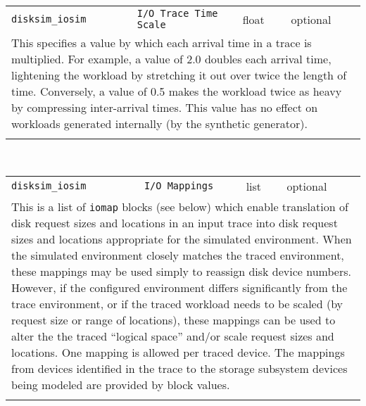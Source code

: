 \noindent 
\begin{tabular}{|p{1.5in}|p{3.5in}|p{0.5in}|p{0.5in}|}
\cline{1-4}
\texttt{disksim\_iosim} & \texttt{I/O Trace Time Scale} & float & optional \\ 
\cline{1-4}
\multicolumn{4}{|p{6in}|}{
This specifies a value by which each arrival time in a trace is
multiplied. For example, a value of 2.0 doubles each arrival time,
lightening the workload by stretching it out over twice the length of
time. Conversely, a value of 0.5 makes the workload twice as heavy by
compressing inter-arrival times. This value has no effect on
workloads generated internally (by the synthetic generator).
}\\ 
\cline{1-4}
\multicolumn{4}{p{5in}}{}\\
\end{tabular}\\ 
\noindent 
\begin{tabular}{|p{1.5in}|p{3.5in}|p{0.5in}|p{0.5in}|}
\cline{1-4}
\texttt{disksim\_iosim} & \texttt{I/O Mappings} & list & optional \\ 
\cline{1-4}
\multicolumn{4}{|p{6in}|}{
This is a list of \texttt{iomap} blocks (see below) which enable translation
of disk request sizes and locations in an input trace into disk
request sizes and locations appropriate for the simulated environment.
When the simulated environment closely matches the traced environment,
these mappings may be used simply to reassign disk device numbers.
However, if the configured environment differs significantly from the
trace environment, or if the traced workload needs to be scaled (by
request size or range of locations), these mappings can be used to
alter the the traced ``logical space'' and/or scale request sizes and
locations. One mapping is allowed per traced device.
The mappings from devices identified in the trace to the storage
subsystem devices being modeled are provided by block values.
}\\ 
\cline{1-4}
\multicolumn{4}{p{5in}}{}\\
\end{tabular}\\ 
